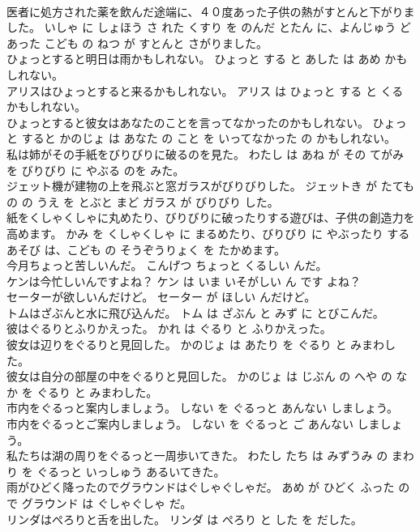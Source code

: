 \documentclass[8pt]{extreport}
\begin{document}
\begin{CJK}{UTF8}{min}
\\	医者に処方された薬を飲んだ途端に、４０度あった子供の熱がすとんと下がりました。	いしゃ に しょほう さ れた くすり を のんだ とたん に、よんじゅう ど あった こども の ねつ が すとんと さがりました。	
\\	ひょっとすると明日は雨かもしれない。	ひょっと する と あした は あめ かもしれない。	
\\	アリスはひょっとすると来るかもしれない。	アリス は ひょっと する と くる かもしれない。	
\\	ひょっとすると彼女はあなたのことを言ってなかったのかもしれない。	ひょっと すると かのじょ は あなた の こと を いってなかった の かもしれない。	
\\	私は姉がその手紙をびりびりに破るのを見た。	わたし は あね が その てがみ を びりびり に やぶる のを みた。	
\\	ジェット機が建物の上を飛ぶと窓ガラスがびりびりした。	ジェットき が たてもの の うえ を とぶと まど ガラス が びりびり した。	
\\	紙をくしゃくしゃに丸めたり、びりびりに破ったりする遊びは、子供の創造力を高めます。	かみ を くしゃくしゃ に まるめたり、びりびり に やぶったり する あそび は、こども の そうぞうりょく を たかめます。	
\\	今月ちょっと苦しいんだ。	こんげつ ちょっと くるしい んだ。	
\\	ケンは今忙しいんですよね？	ケン は いま いそがしい ん です よね？	
\\	セーターが欲しいんだけど。	セーター が ほしい んだけど。	
\\	トムはざぶんと水に飛び込んだ。	トム は ざぶん と みず に とびこんだ。	
\\	彼はぐるりとふりかえった。	かれ は ぐるり と ふりかえった。	
\\	彼女は辺りをぐるりと見回した。	かのじょ は あたり を ぐるり と みまわした。	
\\	彼女は自分の部屋の中をぐるりと見回した。	かのじょ は じぶん の へや の なか を ぐるり と みまわした。	
\\	市内をぐるっと案内しましょう。	しない を ぐるっと あんない しましょう。	
\\	市内をぐるっとご案内しましょう。	しない を ぐるっと ご あんない しましょう。	
\\	私たちは湖の周りをぐるっと一周歩いてきた。	わたし たち は みずうみ の まわり を ぐるっと いっしゅう あるいてきた。	
\\	雨がひどく降ったのでグラウンドはぐしゃぐしゃだ。	あめ が ひどく ふった ので グラウンド は ぐしゃぐしゃ だ。	
\\	リンダはぺろりと舌を出した。	リンダ は ぺろり と した を だした。	

\end{CJK}
\end{document}
